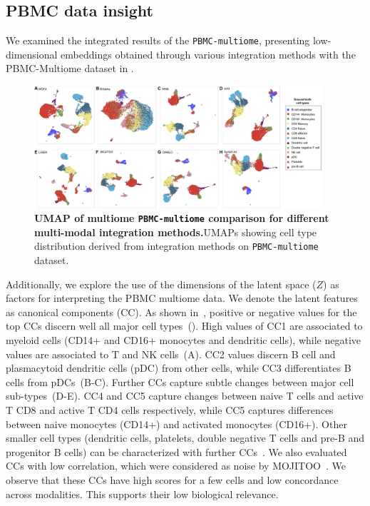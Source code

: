 \subsection{PBMC data insight}
We examined the integrated results of the \texttt{PBMC-multiome}, presenting low-dimensional embeddings obtained through various integration methods with the PBMC-Multiome dataset in .
\begin{figure}[!ht]
	\centering
	\includegraphics[width=0.95\textwidth]{pbmc_multiome_umap/fig}
	\vspace{0.1cm}
	\caption[UMAP of multiome PBMC comparison for different multi-modal integration methods.]{\textbf{UMAP of multiome \texttt{PBMC-multiome} comparison for different multi-modal integration methods.}UMAPs showing cell type distribution derived from integration methods on \texttt{PBMC-multiome} dataset. }
	\label{fig:pbmc_multiome_umap}
\end{figure}

Additionally, we explore the use of the dimensions of the latent space ($Z$) as factors for interpreting the PBMC multiome data. We denote the latent features as canonical components (CC). As shown in~, positive or negative values for the top CCs discern well all major cell types~(). High values of CC1 are associated to myeloid cells (CD14+ and CD16+ monocytes and dendritic cells), while negative values are associated to T and NK cells~(A). CC2 values discern B cell and plasmacytoid dendritic cells (pDC) from other cells, while CC3 differentiates B cells from pDCs~(B-C). Further CCs capture subtle changes between major cell sub-types~(D-E). CC4 and CC5 capture changes between naive T cells and active T CD8 and active T CD4 cells respectively, while CC5 captures differences between naive monocytes (CD14+) and activated monocytes (CD16+). Other smaller cell types (dendritic cells, platelets, double negative T cells and pre-B and progenitor B cells) can be characterized with further CCs~. We also evaluated CCs with low correlation, which were considered as noise by MOJITOO~. We observe that these CCs have high scores for a few cells and low concordance across modalities. This supports their low biological relevance.


